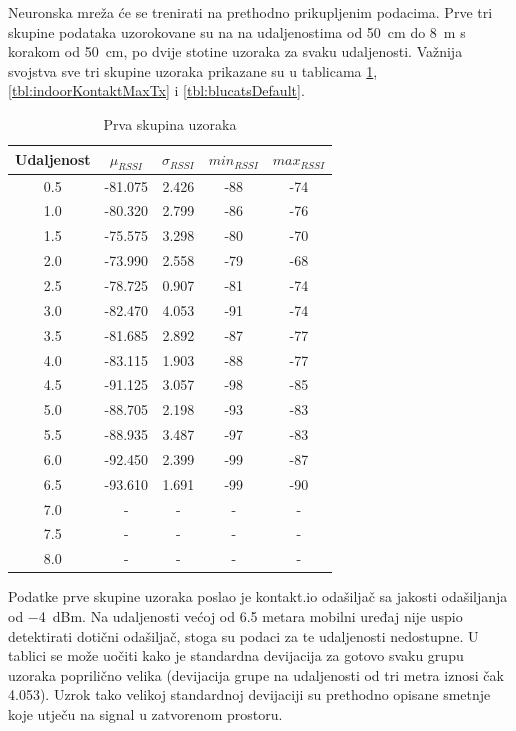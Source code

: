 Neuronska mreža će se trenirati na prethodno prikupljenim podacima. 
Prve tri skupine podataka uzorokovane su na na udaljenostima od \SI{50}{cm} do \SI{8}{m} s korakom od \SI{50}{cm}, po dvije stotine uzoraka za svaku udaljenosti. 
Važnija svojstva sve tri skupine uzoraka prikazane su u tablicama \ref{tbl:indoorKontaktDefaultTx}, \ref{tbl:indoorKontaktMaxTx} i \ref{tbl:blucatsDefault}.

\begin{table}[H]
	\centering
	\caption{Prva skupina uzoraka}
	\label{tbl:indoorKontaktDefaultTx}
	\small
	\begin{tabular}{ccccc}
	\hline
	Udaljenost & $\mu_{RSSI}$ & $\sigma_{RSSI}$ & $min_{RSSI}$ & $max_{RSSI}$ \\
	\hline
	0.5 & -81.075 & 2.426 & -88 & -74 \\
	1.0 & -80.320 & 2.799 & -86 & -76 \\
	1.5 & -75.575 & 3.298 & -80 & -70 \\
	2.0 & -73.990 & 2.558 & -79 & -68 \\
	2.5 & -78.725 & 0.907 & -81 & -74 \\
	3.0 & -82.470 & 4.053 & -91 & -74 \\
	3.5 & -81.685 & 2.892 & -87 & -77 \\
	4.0 & -83.115 & 1.903 & -88 & -77 \\
	4.5 & -91.125 & 3.057 & -98 & -85 \\
	5.0 & -88.705 & 2.198 & -93 & -83 \\
	5.5 & -88.935 & 3.487 & -97 & -83 \\
	6.0 & -92.450 & 2.399 & -99 & -87 \\
	6.5 & -93.610 & 1.691 & -99 & -90 \\
	7.0 & - & - & - & - \\
	7.5 & - & - & - & - \\
	8.0 & - & - & - & - \\
	\hline
	\end{tabular}
\end{table}

Podatke prve skupine uzoraka poslao je kontakt.io odašiljač sa jakosti odašiljanja od \SI{-4}{dBm}. 
Na udaljenosti većoj od 6.5 metara mobilni uređaj nije uspio detektirati dotični odašiljač, stoga su podaci za te udaljenosti nedostupne. 
U tablici se može uočiti kako je standardna devijacija za gotovo svaku grupu uzoraka poprilično velika (devijacija grupe na udaljenosti od tri metra iznosi čak 4.053). 
Uzrok tako velikoj standardnoj devijaciji su prethodno opisane smetnje koje utječu na signal u zatvorenom prostoru.

